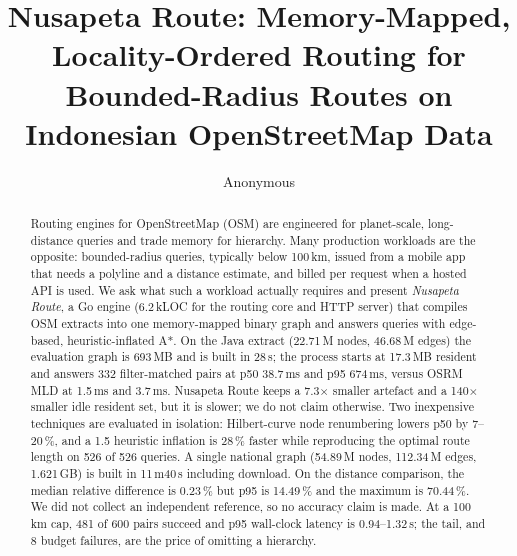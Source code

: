 \documentclass[sigconf,nonacm]{acmart}
\begin{document}
\title{Nusapeta Route: Memory-Mapped, Locality-Ordered Routing for Bounded-Radius Routes on Indonesian OpenStreetMap Data}

\author{Anonymous}
\renewcommand{\shortauthors}{Anonymous}

\begin{abstract}
Routing engines for OpenStreetMap (OSM) are engineered for planet-scale,
long-distance queries and trade memory for hierarchy. Many production workloads
are the opposite: bounded-radius queries, typically below 100\,km, issued from a
mobile app that needs a polyline and a distance estimate, and billed per request
when a hosted API is used. We ask what such a workload actually requires and
present \emph{Nusapeta Route}, a Go engine (6.2\,kLOC for the routing core and HTTP
server) that compiles OSM extracts into one memory-mapped binary graph and
answers queries with edge-based, heuristic-inflated A*. On the Java extract
(22.71\,M nodes, 46.68\,M edges) the evaluation graph is 693\,MB and is built in
28\,s; the process starts at 17.3\,MB resident and answers 332 filter-matched
pairs at p50 38.7\,ms and p95 674\,ms, versus OSRM MLD at 1.5\,ms and 3.7\,ms.
Nusapeta Route keeps a 7.3$\times$ smaller artefact and a 140$\times$ smaller idle
resident set, but it is slower; we do not claim otherwise. Two inexpensive
techniques are evaluated in isolation: Hilbert-curve node renumbering lowers p50
by 7--20\,\%, and a 1.5 heuristic inflation is 28\,\% faster while reproducing the
optimal route length on 526 of 526 queries. A single national graph (54.89\,M
nodes, 112.34\,M edges, 1.621\,GB) is built in 11\,m40\,s including download.
On the distance comparison, the median relative difference is 0.23\,\% but p95 is
14.49\,\% and the maximum is 70.44\,\%. We did not collect an independent
reference, so no accuracy claim is made. At a 100\,km cap, 481 of 600 pairs
succeed and p95 wall-clock latency is 0.94--1.32\,s; the tail, and 8 budget
failures, are the price of omitting a hierarchy.
\end{abstract}


\maketitle
\end{document}
